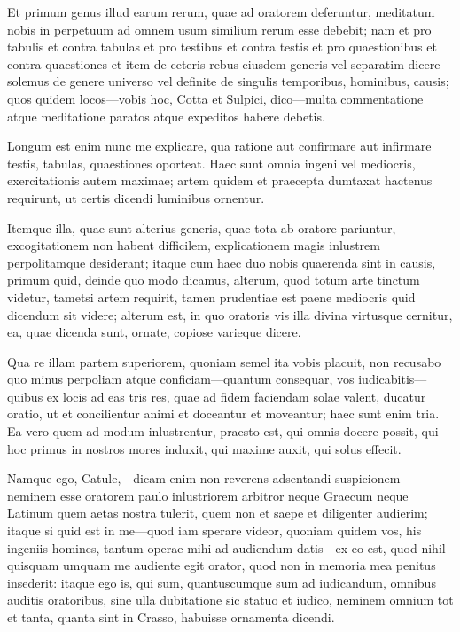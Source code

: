 Et primum genus illud earum rerum, quae ad oratorem deferuntur, meditatum nobis in perpetuum ad omnem usum similium rerum esse debebit; nam et pro tabulis et contra tabulas et pro testibus et contra testis et pro quaestionibus et contra quaestiones et item de ceteris rebus eiusdem generis vel separatim dicere solemus de genere universo vel definite de singulis temporibus, hominibus, causis; quos quidem locos—vobis hoc, Cotta et Sulpici, dico—multa commentatione atque meditatione paratos atque expeditos habere debetis.

 Longum est enim nunc me explicare, qua ratione aut confirmare aut infirmare testis, tabulas, quaestiones oporteat. Haec sunt omnia ingeni vel mediocris, exercitationis autem maximae; artem quidem et praecepta dumtaxat hactenus requirunt, ut certis dicendi luminibus ornentur.

 Itemque illa, quae sunt alterius generis, quae tota ab oratore pariuntur, excogitationem non habent difficilem, explicationem magis inlustrem perpolitamque desiderant; itaque cum haec duo nobis quaerenda sint in causis, primum quid, deinde quo modo dicamus, alterum, quod totum arte tinctum videtur, tametsi artem requirit, tamen prudentiae est paene mediocris quid dicendum sit videre; alterum est, in quo oratoris vis illa divina virtusque cernitur, ea, quae dicenda sunt, ornate, copiose varieque dicere.

 Qua re illam partem superiorem, quoniam semel ita vobis placuit, non recusabo quo minus perpoliam atque conficiam—quantum consequar, vos iudicabitis—quibus ex locis ad eas tris res, quae ad fidem faciendam solae valent, ducatur oratio, ut et concilientur animi et doceantur et moveantur; haec sunt enim tria. Ea vero quem ad modum inlustrentur, praesto est, qui omnis docere possit, qui hoc primus in nostros mores induxit, qui maxime auxit, qui solus effecit.

 Namque ego, Catule,—dicam enim non reverens adsentandi suspicionem—neminem esse oratorem paulo inlustriorem arbitror neque Graecum neque Latinum quem aetas nostra tulerit, quem non et saepe et diligenter audierim; itaque si quid est in me—quod iam sperare videor, quoniam quidem vos, his ingeniis homines, tantum operae mihi ad audiendum datis—ex eo est, quod nihil quisquam umquam me audiente egit orator, quod non in memoria mea penitus insederit: itaque ego is, qui sum, quantuscumque sum ad iudicandum, omnibus auditis oratoribus, sine ulla dubitatione sic statuo et iudico, neminem omnium tot et tanta, quanta sint in Crasso, habuisse ornamenta dicendi.

